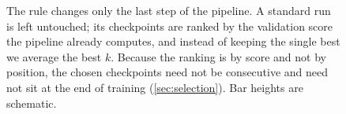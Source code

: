 \begin{figure}[t]
{}
\caption{The rule changes only the last step of the pipeline. A standard run is
  left untouched; its checkpoints are ranked by the validation score the
  pipeline already computes, and instead of keeping the single best we average
  the best $k$. Because the ranking is by score and not by position, the chosen
  checkpoints need not be consecutive and need not sit at the end of training
  (\cref{sec:selection}). Bar heights are schematic.}
\label{fig:pipeline}
\end{figure}
